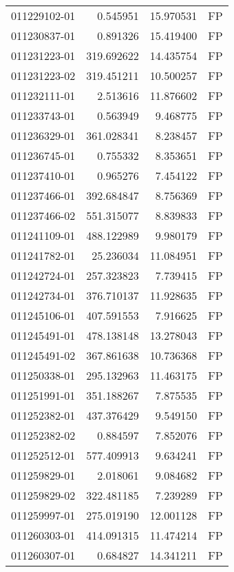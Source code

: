 \begin{tabular}{lrrl}
011229102-01 &    0.545951 &      15.970531 &   FP \\
011230837-01 &    0.891326 &      15.419400 &   FP \\
011231223-01 &  319.692622 &      14.435754 &   FP \\
011231223-02 &  319.451211 &      10.500257 &   FP \\
011232111-01 &    2.513616 &      11.876602 &   FP \\
011233743-01 &    0.563949 &       9.468775 &   FP \\
011236329-01 &  361.028341 &       8.238457 &   FP \\
011236745-01 &    0.755332 &       8.353651 &   FP \\
011237410-01 &    0.965276 &       7.454122 &   FP \\
011237466-01 &  392.684847 &       8.756369 &   FP \\
011237466-02 &  551.315077 &       8.839833 &   FP \\
011241109-01 &  488.122989 &       9.980179 &   FP \\
011241782-01 &   25.236034 &      11.084951 &   FP \\
011242724-01 &  257.323823 &       7.739415 &   FP \\
011242734-01 &  376.710137 &      11.928635 &   FP \\
011245106-01 &  407.591553 &       7.916625 &   FP \\
011245491-01 &  478.138148 &      13.278043 &   FP \\
011245491-02 &  367.861638 &      10.736368 &   FP \\
011250338-01 &  295.132963 &      11.463175 &   FP \\
011251991-01 &  351.188267 &       7.875535 &   FP \\
011252382-01 &  437.376429 &       9.549150 &   FP \\
011252382-02 &    0.884597 &       7.852076 &   FP \\
011252512-01 &  577.409913 &       9.634241 &   FP \\
011259829-01 &    2.018061 &       9.084682 &   FP \\
011259829-02 &  322.481185 &       7.239289 &   FP \\
011259997-01 &  275.019190 &      12.001128 &   FP \\
011260303-01 &  414.091315 &      11.474214 &   FP \\
011260307-01 &    0.684827 &      14.341211 &   FP \\

\end{tabular}
